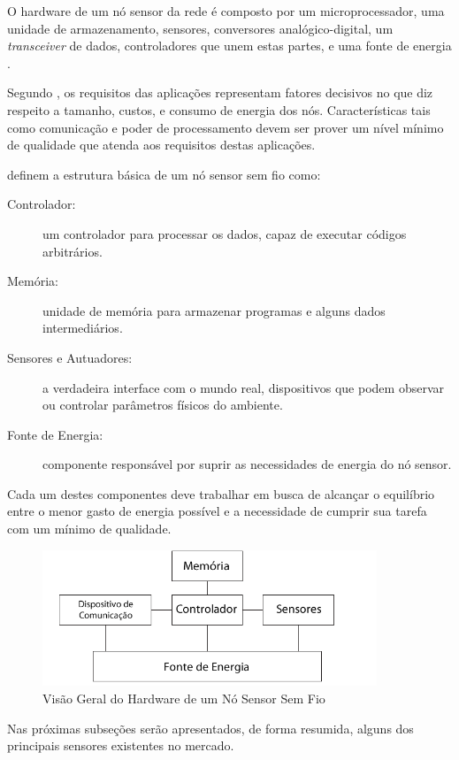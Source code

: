 O hardware de um nó sensor da rede é composto por um microprocessador, uma unidade de armazenamento, sensores, conversores analógico-digital, um \emph{transceiver} de dados, controladores que unem estas partes, e uma fonte de energia \cite{Culler2004}.

Segundo \cite{Holger2005}, os requisitos das aplicações representam fatores decisivos no que diz respeito a tamanho, custos, e consumo de energia dos nós. Características tais como comunicação e poder de processamento devem ser prover um nível mínimo de qualidade que atenda aos requisitos destas aplicações. 

\cite{Holger2005} definem a estrutura básica de um nó sensor sem fio como:
\begin{description}
\item[Controlador:] um controlador para processar os dados, capaz de executar códigos arbitrários.
\item[Memória:] unidade de memória para armazenar programas e alguns dados intermediários.
\item[Sensores e Autuadores:] a verdadeira interface com o mundo real, dispositivos que podem observar ou controlar parâmetros físicos do ambiente.
\item[Fonte de Energia:] componente responsável por suprir as necessidades de energia do nó sensor.
\end{description}

Cada um destes componentes deve trabalhar em busca de alcançar o equilíbrio entre o menor gasto de energia possível e a necessidade de cumprir sua tarefa com um mínimo de qualidade.

\begin{figure}[h!]
\centering
\includegraphics[width=10cm]{pictures/overview_node.png}
\caption{Visão Geral do Hardware de um Nó Sensor Sem Fio}
 \label{fig:overview}
\end{figure}

Nas próximas subseções serão apresentados, de forma resumida, alguns dos principais sensores existentes no mercado.

